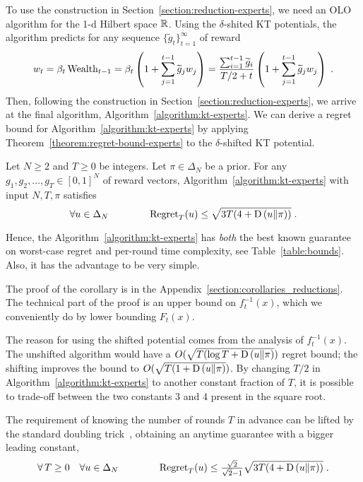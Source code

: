 To use the construction in Section~\ref{section:reduction-experts}, we need an OLO algorithm for the 1-d Hilbert space $\mathbb{R}$.
Using the $\delta$-shited KT potentials, the algorithm predicts for any sequence $\{\widetilde g_t\}_{t=1}^\infty$ of reward
\[
w_t
= \beta_t \operatorname{Wealth}_{t-1}
= \beta_t \left(1 + \sum_{j=1}^{t-1} \widetilde g_j w_j \right)
= \frac{\sum_{i=1}^{t-1} \widetilde g_i}{T/2+t} \left(1 + \sum_{j=1}^{t-1} \widetilde g_j w_j \right) \; .
\]
Then, following the construction in Section~\ref{section:reduction-experts}, we
arrive at the final algorithm, Algorithm~\ref{algorithm:kt-experts}.
We can derive a regret bound for Algorithm~\ref{algorithm:kt-experts} by
applying Theorem~\ref{theorem:regret-bound-experts} to the $\delta$-shifted KT
potential.
%
\begin{corollary} \label{corollary:kt-experts-regret} Let
$N \ge 2$ and $T \ge 0$ be integers. Let $\pi \in \Delta_N$ be a prior.  For
any $g_1, g_2, \dots, g_T \in [0,1]^N$ of reward vectors,
Algorithm~\ref{algorithm:kt-experts} with input $N,T,\pi$ satisfies
\[
\forall u \in \Delta_N \qquad \qquad \operatorname{Regret}_T(u) \le \sqrt{3T (4 + \operatorname*{D}\left({u}\middle\|{\pi}\right))} \; .
\]
\end{corollary}
%
Hence, the Algorithm~\ref{algorithm:kt-experts} has \emph{both} the best known guarantee on worst-case regret and per-round time complexity, see Table~\ref{table:bounds}. Also, it has the advantage to be very simple.

The proof of the corollary is in the
Appendix~\ref{section:corollaries_reductions}.  The technical part of the proof
is an upper bound on $f_t^{-1}(x)$, which we conveniently do by lower bounding
$F_t(x)$.

The reason for using the shifted potential comes from the analysis of
$f_t^{-1}(x)$. The unshifted algorithm would have a $O(\sqrt{T (\log T +
\operatorname*{D}\left({u}\middle\|{\pi}\right)})$ regret bound; the shifting improves the bound to $O(\sqrt{T (1 +
\operatorname*{D}\left({u}\middle\|{\pi}\right)})$.  By changing $T/2$ in Algorithm~\ref{algorithm:kt-experts} to
another constant fraction of $T$, it is possible to trade-off between the two
constants $3$ and $4$ present in the square root.

The requirement of knowing the number of rounds $T$ in advance can be lifted by
the standard doubling trick~\cite[Section 2.3.1]{Shalev-Shwartz-2011}, obtaining an anytime guarantee with a bigger leading constant,
\[
\forall \, T \ge 0 \quad \forall u \in \Delta_N \qquad \qquad
\operatorname{Regret}_T(u) \le \tfrac{\sqrt{2}}{\sqrt{2} - 1} \sqrt{3T (4 + \operatorname*{D}\left({u}\middle\|{\pi}\right))} \; .
\]
